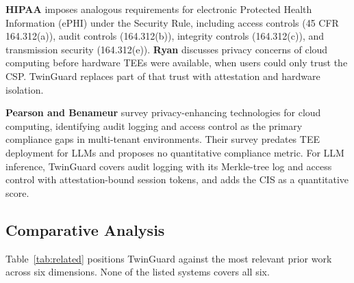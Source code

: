\documentclass{ieeeaccess}
\begin{document}
\textbf{HIPAA} \cite{hipaa1996} imposes analogous requirements for
electronic Protected Health Information (ePHI) under the Security Rule,
including access controls (45 CFR 164.312(a)), audit controls (164.312(b)),
integrity controls (164.312(c)), and transmission security (164.312(e)).
\textbf{Ryan} \cite{ryan2011cloud} discusses privacy concerns of cloud computing
before hardware TEEs were available, when users could only trust the CSP.
TwinGuard replaces part of that trust with attestation and hardware isolation.

\textbf{Pearson and Benameur} \cite{pearson2012privacy} survey
privacy-enhancing technologies for cloud computing, identifying audit
logging and access control as the primary compliance gaps in multi-tenant
environments. Their survey predates TEE deployment for LLMs and proposes no
quantitative compliance metric. For LLM inference, TwinGuard covers audit
logging with its Merkle-tree log and access control with attestation-bound
session tokens, and adds the CIS as a quantitative score.

\subsection{Comparative Analysis}

Table~\ref{tab:related} positions TwinGuard against the most relevant prior
work across six dimensions. None of the listed systems covers all six.
\end{document}
